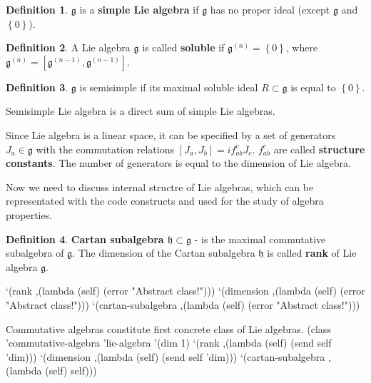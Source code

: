 \documentclass[a4paper,10pt]{article}
\theoremstyle{definition} \newtheorem{Def}{Definition}
\begin{document}
\begin{Def}
  $\mathfrak{g}$ is a {\bf simple Lie algebra} if $\mathfrak{g}$ has no proper ideal (except $\mathfrak{g}$ and $\left\{0\right\}$).
\end{Def}

\begin{Def}
  A Lie algebra $\mathfrak{g}$ is called {\bf soluble} if $\mathfrak{g}^{(n)}=\left\{0\right\}$, where $\mathfrak{g}^{(n)}=[\mathfrak{g}^{(n-1)},\mathfrak{g}^{(n-1)}]$.
\end{Def}
\begin{Def}
  $\mathfrak{g}$ is semisimple if its maximal soluble ideal $R\subset\mathfrak{g}$ is equal to $\left\{0\right\}$.
\end{Def}
Semisimple Lie algebra is a direct sum of simple Lie algebras.

Since Lie algebra is a linear space, it can be specified by a set of generators $J_a\in \mathfrak{g}$ with the commutation relations $[J_a,J_b]=if_{ab}^cJ_c$. $f_{ab}^c$ are called {\bf structure constants}. The number of generators is equal to the dimension of Lie algebra.

Now we need to discuss internal structre of Lie algebras, which can be representated with the code constructs and used for the study of algebra properties.

\begin{Def}
  {\bf Cartan subalgebra $\mathfrak{h}\subset\mathfrak{g}$} - is the maximal commutative subalgebra of $\mathfrak{g}$. The dimension of the Cartan subalgebra $\mathfrak{h}$ is called {\bf rank} of Lie algebra $\mathfrak{g}$.
\end{Def}
\nwenddocs{}\endmoddef
`(rank ,(lambda (self)
              (error "Abstract class!")))
`(dimension ,(lambda (self)
              (error "Abstract class!")))
`(cartan-subalgebra ,(lambda (self) 
              (error "Abstract class!")))

\nwendcode{}\nwdocspar
Commutative algebras constitute first concrete class of Lie algebras.
\nwenddocs{}\endmoddef
(class 'commutative-algebra 'lie-algebra
       '(dim 1)
       `(rank ,(lambda (self) (send self 'dim)))
       `(dimension ,(lambda (self) (send self 'dim)))
       `(cartan-subalgebra ,(lambda (self) self)))
\end{document}
